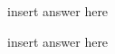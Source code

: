 \documentclass[
    ngerman,american
    ]{scrartcl}
\newcommand{\lang}{en}
\begin{document}
        \begin{description}[style=unboxed]
            \item [\questionOne{\lang}] 
                insert answer here

            \item [\questionTwo{\lang}]
                insert answer here


\end{description}
\end{document}
